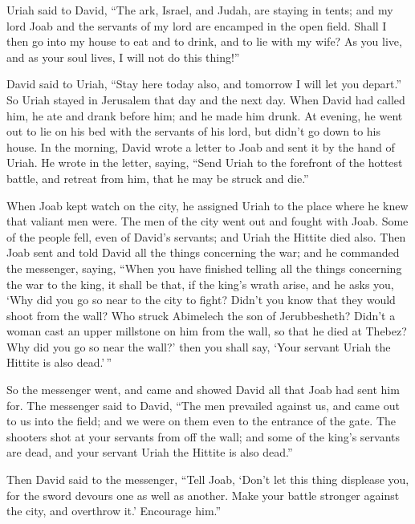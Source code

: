  Uriah said to David, ``The ark, Israel, and Judah, are
staying in tents; and my lord Joab and the servants of my lord are
encamped in the open field. Shall I then go into my house to eat and to
drink, and to lie with my wife? As you live, and as your soul lives, I
will not do this thing!''

 David said to Uriah, ``Stay here today also, and
tomorrow I will let you depart.'' So Uriah stayed in Jerusalem that day
and the next day.  When David had called him, he ate and
drank before him; and he made him drunk. At evening, he went out to lie
on his bed with the servants of his lord, but didn't go down to his
house.  In the morning, David wrote a letter to Joab and
sent it by the hand of Uriah.  He wrote in the letter,
saying, ``Send Uriah to the forefront of the hottest battle, and retreat
from him, that he may be struck and die.''

 When Joab kept watch on the city, he assigned Uriah to
the place where he knew that valiant men were.  The men
of the city went out and fought with Joab. Some of the people fell, even
of David's servants; and Uriah the Hittite died also. 
Then Joab sent and told David all the things concerning the war;
 and he commanded the messenger, saying, ``When you have
finished telling all the things concerning the war to the king,
 it shall be that, if the king's wrath arise, and he asks
you, `Why did you go so near to the city to fight? Didn't you know that
they would shoot from the wall?  Who struck Abimelech the
son of Jerubbesheth? Didn't a woman cast an upper millstone on him from
the wall, so that he died at Thebez? Why did you go so near the wall?'
then you shall say, `Your servant Uriah the Hittite is also dead.'\,''

 So the messenger went, and came and showed David all
that Joab had sent him for.  The messenger said to David,
``The men prevailed against us, and came out to us into the field; and
we were on them even to the entrance of the gate.  The
shooters shot at your servants from off the wall; and some of the king's
servants are dead, and your servant Uriah the Hittite is also dead.''

 Then David said to the messenger, ``Tell Joab, `Don't
let this thing displease you, for the sword devours one as well as
another. Make your battle stronger against the city, and overthrow it.'
Encourage him.''

